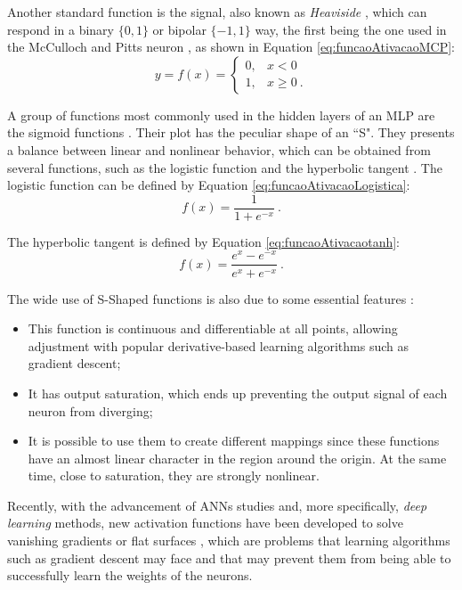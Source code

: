 Another standard function is the signal, also known as \textit{Heaviside} \cite{haykin}, which can respond in a binary $\{0, 1\}$ or bipolar $\{-1, 1\}$ way, the first being the one used in the McCulloch and Pitts neuron \cite{McCulloch1990}, as shown in Equation \ref{eq:funcaoAtivacaoMCP}:
\begin{equation}
	\label{eq:funcaoAtivacaoMCP}
	y = f(x) = \left\{\begin{matrix}
		0, & x < 0    \\
		1, & x \geq 0 \: .
	\end{matrix}\right.
\end{equation}

A group of functions most commonly used in the hidden layers of an MLP are the sigmoid functions \cite{haykin, Castro2006FundamentalsON}. Their plot has the peculiar shape of an ``S". They presents a balance between linear and nonlinear behavior, which can be obtained from several functions, such as the logistic function and the hyperbolic tangent \cite{Jeffrey2008}. The logistic function can be defined by Equation \ref{eq:funcaoAtivacaoLogistica}:
\begin{equation}
	\label{eq:funcaoAtivacaoLogistica}
	f(x) = \frac{1}{1 + e^{-x}}\:.
\end{equation}

The hyperbolic tangent is defined by Equation \ref{eq:funcaoAtivacaotanh}:
\begin{equation}
\label{eq:funcaoAtivacaotanh}
	f(x) = \frac{e^x - e^{-x}}{e^x + e^{-x}}\:.
\end{equation}

The wide use of S-Shaped functions is also due to some essential features \cite{Menon1996}:

\begin{itemize}
    \item This function is continuous and differentiable at all points, allowing adjustment with popular derivative-based learning algorithms such as gradient descent;
    \item It has output saturation, which ends up preventing the output signal of each neuron from diverging;
    \item It is possible to use them to create different mappings since these functions have an almost linear character in the region around the origin. At the same time, close to saturation, they are strongly nonlinear.
\end{itemize}

Recently, with the advancement of ANNs studies and, more specifically, \textit{deep learning} methods, new activation functions have been developed to solve vanishing gradients or flat surfaces \cite{Fahlman1988}, which are problems that learning algorithms such as gradient descent may face and that may prevent them from being able to successfully learn the weights of the neurons.

